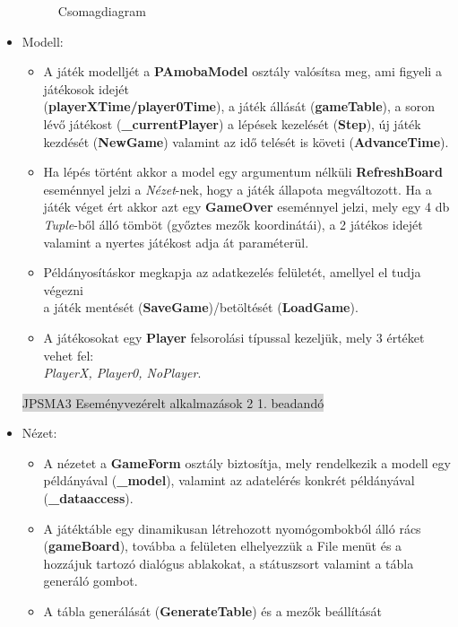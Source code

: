 \documentclass[11pt,a4paper]{article}
\begin{document}
\begin{itemize}
\begin{figure}[h]
		\caption{Csomagdiagram}
	\end{figure}
	\item Modell:
	\begin{itemize}
		\item A játék modelljét a \textbf{PAmobaModel} osztály valósítsa meg, ami figyeli
		a játékosok idejét\\(\textbf{playerXTime/player0Time}), a játék állását
		(\textbf{gameTable}), a soron lévő játékost (\textbf{\_currentPlayer})
		a lépések kezelését (\textbf{Step}), új játék kezdését (\textbf{NewGame})
		valamint az idő telését is követi (\textbf{AdvanceTime}).
		\item Ha lépés történt akkor a model egy argumentum nélküli \textbf{RefreshBoard}
		eseménnyel jelzi a \textit{Nézet}-nek, hogy a játék állapota megváltozott.
		Ha a játék véget ért akkor azt egy \textbf{GameOver} eseménnyel jelzi, mely egy
		4 db \textit{Tuple}-ből álló tömböt (győztes mezők koordinátái), a 2 játékos
		idejét valamint a nyertes játékost adja át paraméterül.
		\item Példányosításkor megkapja az adatkezelés felületét, amellyel el tudja végezni
		\\ a játék mentését (\textbf{SaveGame})/betöltését (\textbf{LoadGame}).
		\item A játékosokat egy \textbf{Player} felsorolási típussal kezeljük, mely
		3 értéket vehet fel:\\ \textit{PlayerX, Player0, NoPlayer}.
	\end{itemize}
	\newpage
	\thispagestyle{empty}
	\begin{center}
	\colorbox{lightgray}{{\large JPSMA3} \hspace{3cm} {\large Eseményvezérelt alkalmazások 2 1. beadandó} \hspace{5cm} \thepage}
	\end{center}
	\item Nézet:
	\begin{itemize}
		\item A nézetet a \textbf{GameForm} osztály biztosítja, mely rendelkezik a modell
		egy példányával (\textbf{\_model}), valamint az adatelérés konkrét példányával
		(\textbf{\_dataaccess}).
		\item A játéktáble egy dinamikusan létrehozott nyomógombokból álló rács
		(\textbf{gameBoard}), továbba a felületen elhelyezzük a File menüt és a hozzájuk
		tartozó dialógus ablakokat, a státuszsort valamint a tábla generáló gombot.
		\item A tábla generálását (\textbf{GenerateTable}) és a mezők beállítását

\end{itemize}
\end{itemize}
\end{document}
